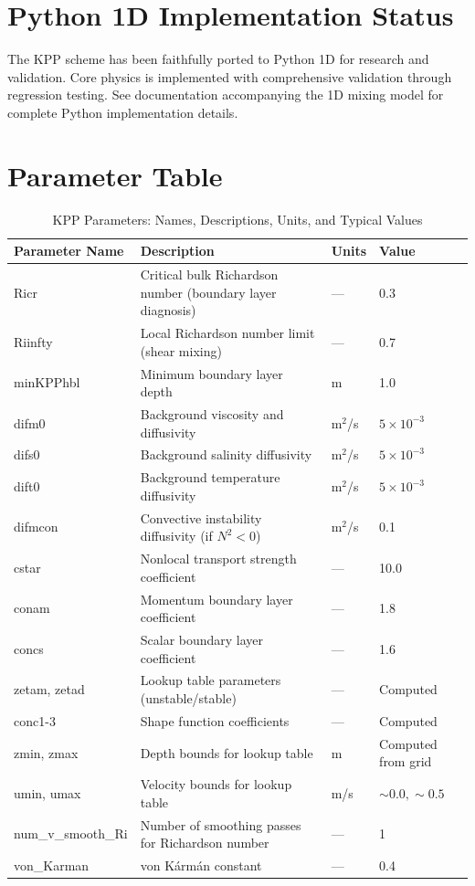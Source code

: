 \documentclass[11pt, a4paper]{article}
\begin{document}
\section{Python 1D Implementation Status}

The KPP scheme has been faithfully ported to Python 1D for research and validation. Core physics is implemented with comprehensive validation through regression testing. See documentation accompanying the 1D mixing model for complete Python implementation details.

\appendix

\section{Parameter Table}

\begin{longtable}{lp{6cm}ll}
\caption{KPP Parameters: Names, Descriptions, Units, and Typical Values} \\
\toprule
\textbf{Parameter Name} & \textbf{Description} & \textbf{Units} & \textbf{Value} \\
\midrule
\endhead
\bottomrule
\endfoot

Ricr & Critical bulk Richardson number (boundary layer diagnosis) & — & 0.3 \\
Riinfty & Local Richardson number limit (shear mixing) & — & 0.7 \\
minKPPhbl & Minimum boundary layer depth & m & 1.0 \\
\midrule
difm0 & Background viscosity and diffusivity & m$^2$/s & $5 \times 10^{-3}$ \\
difs0 & Background salinity diffusivity & m$^2$/s & $5 \times 10^{-3}$ \\
dift0 & Background temperature diffusivity & m$^2$/s & $5 \times 10^{-3}$ \\
difmcon & Convective instability diffusivity (if $N^2 < 0$) & m$^2$/s & 0.1 \\
\midrule
cstar & Nonlocal transport strength coefficient & — & 10.0 \\
conam & Momentum boundary layer coefficient & — & 1.8 \\
concs & Scalar boundary layer coefficient & — & 1.6 \\
\midrule
zetam, zetad & Lookup table parameters (unstable/stable) & — & Computed \\
conc1-3 & Shape function coefficients & — & Computed \\
\midrule
zmin, zmax & Depth bounds for lookup table & m & Computed from grid \\
umin, umax & Velocity bounds for lookup table & m/s & $\sim 0.0, \sim 0.5$ \\
\midrule
num\_v\_smooth\_Ri & Number of smoothing passes for Richardson number & — & 1 \\
von\_Karman & von Kármán constant & — & 0.4 \\

\end{longtable}
\end{document}
